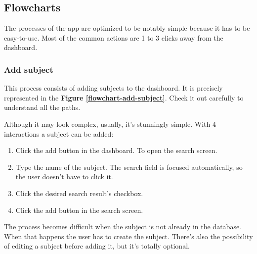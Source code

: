 \clearpage\newpage
\subsection{Flowcharts}

The processes of the app are optimized to be notably simple because it has to be easy-to-use. Most of the common actions are 1 to 3 clicks away from the dashboard. 


\subsubsection*{Add subject}

This process consists of adding subjects to the dashboard. It is precisely represented in the \textbf{Figure \ref{flowchart-add-subject}}. Check it out carefully to understand all the paths.

Although it may look complex, usually, it's stunningly simple. With 4 interactions a subject can be added:
\begin{enumerate}
    \item Click the add button in the dashboard. To open the search screen.
    \item Type the name of the subject. The search field is focused automatically, so the user doesn't have to click it.
    \item Click the desired search result's checkbox. %
    \item Click the add button in the search screen.
\end{enumerate}

\noindent
The process becomes difficult when the subject is not already in the database. When that happens the user has to create the subject. There's also the possibility of editing a subject before adding it, but it's totally optional.

